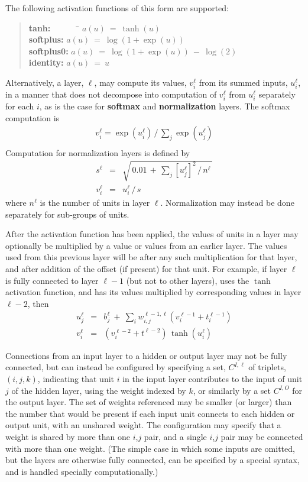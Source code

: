 \documentclass{report}[11pt]
\def\beq{\begin{eqnarray}}
\def\eeq{\end{eqnarray}}
\begin{document}
The following activation functions of this form are supported:\vspace{-24pt}
\begin{quotation}\noindent
\begin{tabbing}
{\bf tanh:}\ \ \ \ \ \ \ \= $a(u)\ =\ \tanh(u)$\\[3pt]
{\bf softplus:}\> $a(u)\ =\ \log(1+\exp(u))$\\[3pt]
{\bf softplus0:}\> $a(u)\ =\ \log(1+\exp(u))\ -\ \log(2)$\\[3pt]
{\bf identity:}\> $a(u)\ =\ u$
\end{tabbing}\vspace*{-12pt}
\end{quotation}
Alternatively, a layer, $\ell$, may compute its values, $v^{\ell}_i$
from its summed inputs, $u^{\ell}_i$, in a manner that does not
decompose into computation of $v^{\ell}_i$ from $u^{\ell}_i$
separately for each $i$, as is the case for \textbf{softmax} and 
\textbf{normalization} layers.  The softmax computation is\vspace{-5pt}
\beq
  v^{\ell}_i = \exp(u^{\ell}_i)\,/\,\textstyle \sum\limits_j \exp(u^{\ell}_j)
  \\[-15pt]\nonumber
\eeq
Computation for normalization layers is defined by
\beq
 s^{\ell} & = & \textstyle 
   \sqrt{\,0.01\,+\,\sum\nolimits_j [u^{\ell}_j]^2\,/\,n^{\ell}\,} 
   \label{defs}\\[3pt]
 v^{\ell}_i & = & u^{\ell}_i\,/\,s
\eeq
where $n^{\ell}$ is the number of units in layer $\ell$.  Normalization
may instead be done separately for sub-groups of units.

After the activation function has been applied, the values of units in
a layer may optionally be multiplied by a value or values from an
earlier layer.  The values used from this previous layer will be after
any such multiplication for that layer, and after addition of the
offset (if present) for that unit.  For example, if layer $\ell$ is
fully connected to layer $\ell\!-\!1$ (but not to other layers), uses the
$\tanh$ activation function, and has its values multiplied by
corresponding values in layer $\ell\!-\!2$, then
\beq
  u^{\ell}_j & = & b^{\ell}_j 
                   \ +\ \sum_i w^{\ell-1,\ell}_{i,j} (v^{\ell-1}_i+t^{\ell-1}_i)
  \\[3pt]
  v^{\ell}_i & = & (v^{\ell-2}_i+t^{\ell-2})\,\tanh(u^{\ell}_i)
\eeq

Connections from an input layer to a hidden or output layer may not be
fully connected, but can instead be configured by specifying a set,
$C^{I,\ell}$ of triplets, $(i,j,k)$, indicating that unit $i$ in the
input layer contributes to the input of unit $j$ of the hidden layer,
using the weight indexed by $k$, or similarly by a set $C^{I,O}$ for
the output layer.  The set of weights referenced may be smaller (or
larger) than the number that would be present if each input unit
connects to each hidden or output unit, with an unshared weight.  The
configuration may specify that a weight is shared by more than one
$i$,$j$ pair, and a single $i$,$j$ pair may be connected with more
than one weight.  (The simple case in which some inputs are omitted,
but the layers are otherwise fully connected, can be specified by a
special syntax, and is handled specially computationally.)
\end{document}
